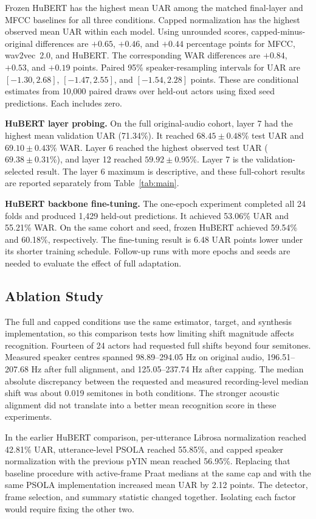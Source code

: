 \documentclass[11pt, letterpaper]{article}
\begin{document}
Frozen HuBERT has the highest mean UAR among the matched final-layer and MFCC baselines for all three conditions. Capped normalization has the highest observed mean UAR within each model. Using unrounded scores, capped-minus-original differences are $+0.65$, $+0.46$, and $+0.44$ percentage points for MFCC, wav2vec~2.0, and HuBERT. The corresponding WAR differences are $+0.84$, $+0.53$, and $+0.19$ points. Paired 95\% speaker-resampling intervals for UAR are $[-1.30,2.68]$, $[-1.47,2.55]$, and $[-1.54,2.28]$ points. These are conditional estimates from 10,000 paired draws over held-out actors using fixed seed predictions. Each includes zero.

\textbf{HuBERT layer probing.} On the full original-audio cohort, layer 7 had the highest mean validation UAR (71.34\%). It reached $68.45\pm0.48$\% test UAR and $69.10\pm0.43$\% WAR. Layer 6 reached the highest observed test UAR ($69.38\pm0.31$\%), and layer 12 reached $59.92\pm0.95$\%. Layer 7 is the validation-selected result. The layer 6 maximum is descriptive, and these full-cohort results are reported separately from Table~\ref{tab:main}.

\textbf{HuBERT backbone fine-tuning.} The one-epoch experiment completed all 24 folds and produced 1,429 held-out predictions. It achieved 53.06\% UAR and 55.21\% WAR. On the same cohort and seed, frozen HuBERT achieved 59.54\% and 60.18\%, respectively. The fine-tuning result is 6.48 UAR points lower under its shorter training schedule. Follow-up runs with more epochs and seeds are needed to evaluate the effect of full adaptation.

\clearpage
\subsection{Ablation Study}
The full and capped conditions use the same estimator, target, and synthesis implementation, so this comparison tests how limiting shift magnitude affects recognition. Fourteen of 24 actors had requested full shifts beyond four semitones. Measured speaker centres spanned 98.89--294.05 Hz on original audio, 196.51--207.68 Hz after full alignment, and 125.05--237.74 Hz after capping. The median absolute discrepancy between the requested and measured recording-level median shift was about 0.019 semitones in both conditions. The stronger acoustic alignment did not translate into a better mean recognition score in these experiments.

In the earlier HuBERT comparison, per-utterance Librosa normalization reached 42.81\% UAR, utterance-level PSOLA reached 55.85\%, and capped speaker normalization with the previous pYIN mean reached 56.95\%. Replacing that baseline procedure with active-frame Praat medians at the same cap and with the same PSOLA implementation increased mean UAR by 2.12 points. The detector, frame selection, and summary statistic changed together. Isolating each factor would require fixing the other two.
\end{document}
